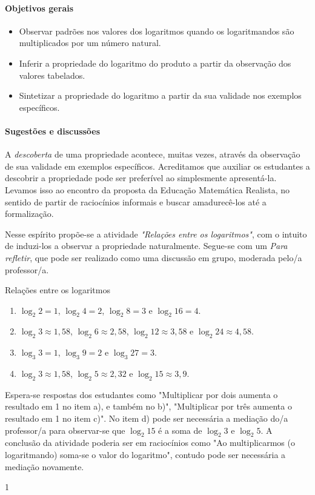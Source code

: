 \clearpage
\def\currentcolor{session1}
\begin{texto}
{
	\paragraph{Objetivos gerais}
	\begin{itemize}
	\item Observar padrões nos valores dos logaritmos quando os logaritmandos são multiplicados por um número natural.
	\item Inferir a propriedade do logaritmo do produto a partir da observação dos valores tabelados.
	\item Sintetizar a propriedade do logaritmo a partir da sua validade nos exemplos específicos.
	\end{itemize}

	\paragraph{Sugestões e discussões}

	A \textit{descoberta} de uma propriedade acontece, muitas vezes, através da observação de sua validade em exemplos específicos. Acreditamos que auxiliar os estudantes a descobrir a propriedade pode ser preferível ao simplesmente apresentá-la. Levamos isso ao encontro da proposta da Educação Matemática Realista, no sentido de partir de raciocínios informais e buscar amadurecê-los até a formalização.

	Nesse espírito propõe-se a atividade \textit{"Relações entre os logaritmos"}, com o intuito de induzi-los a observar a propriedade naturalmente. Segue-se com um \textit{Para refletir}, que pode ser realizado como uma discussão em grupo, moderada pelo/a professor/a.
	\vspace{2em}
}
\end{texto}
\begin{answer}{Relações entre os logaritmos}
{
	\begin{enumerate}
	\item $\log_2 2 = 1$, $\log_2 4 = 2$, $\log_2 8 = 3$ e $\log_2 16 = 4$.
	\item $\log_2 3 \approx 1{,}58$, $\log_2 6 \approx 2{,}58$, $\log_2 12 \approx 3{,}58$ e $\log_2 24 \approx 4{,}58$.
	\item $\log_3 3 = 1$, $\log_3 9 = 2$ e $\log_3 27 = 3$.
	\item $\log_2 3 \approx 1{,}58$, $\log_2 5 \approx 2{,}32$ e $\log_2 15 \approx 3{,}9$.
	\end{enumerate}


	Espera-se respostas dos estudantes como "Multiplicar por dois aumenta o resultado em 1 no item a), e também no b)", "Multiplicar por três aumenta o resultado em 1 no item c)". No item d) pode ser necessária a mediação do/a professor/a para observar-se que $\log _2 15$ é a soma de $\log _2 3$ e $\log _2 5$. A conclusão da atividade poderia ser em raciocínios como "Ao multiplicarmos (o logaritmando) soma-se o valor do logaritmo", contudo pode ser necessária a mediação novamente.
}{1}
\end{answer}
